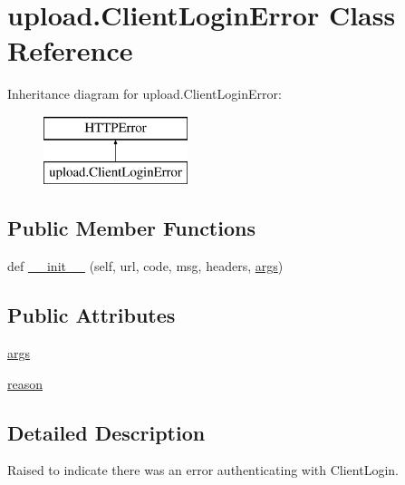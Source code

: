 \hypertarget{classupload_1_1_client_login_error}{}\section{upload.\+Client\+Login\+Error Class Reference}
\label{classupload_1_1_client_login_error}
Inheritance diagram for upload.\+Client\+Login\+Error\+:\begin{figure}[H]
\begin{center}
\leavevmode
\includegraphics[height=2.000000cm]{classupload_1_1_client_login_error}
\end{center}
\end{figure}
\subsection*{Public Member Functions}
\begin{DoxyCompactItemize}
\item 
def \hyperlink{classupload_1_1_client_login_error_a1e590616c2976d881e155958cedbbe47}{\+\_\+\+\_\+init\+\_\+\+\_\+} (self, url, code, msg, headers, \hyperlink{classupload_1_1_client_login_error_ac300a0b034b2bc64cedc51e09fb6d663}{args})
\end{DoxyCompactItemize}
\subsection*{Public Attributes}
\begin{DoxyCompactItemize}
\item 
\hyperlink{classupload_1_1_client_login_error_ac300a0b034b2bc64cedc51e09fb6d663}{args}
\item 
\hyperlink{classupload_1_1_client_login_error_ae0555feb182d89d1e4d7944afbfe14e5}{reason}
\end{DoxyCompactItemize}


\subsection{Detailed Description}
\begin{DoxyVerb}Raised to indicate there was an error authenticating with ClientLogin.\end{DoxyVerb}
 

